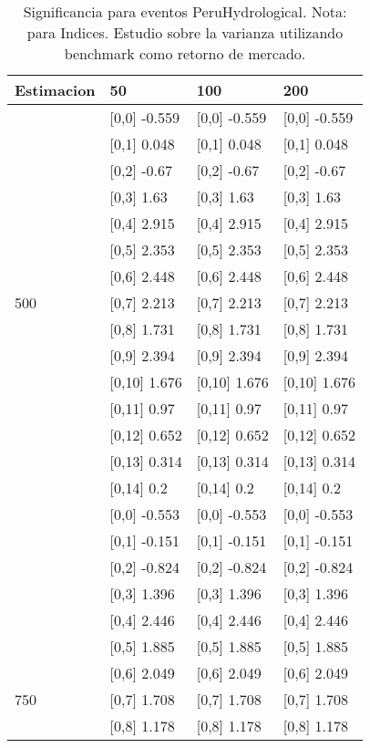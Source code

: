 \begin{table}

\caption{Significancia para eventos PeruHydrological. Nota: para Indices. Estudio sobre la varianza utilizando benchmark como retorno de mercado.}
\centering
\begin{tabular}[t]{llll}
\toprule
Estimacion & 50 & 100 & 200\\
\midrule
 & {}[0,0] -0.559 & {}[0,0] -0.559 & {}[0,0] -0.559\\
 & {}[0,1] 0.048 & {}[0,1] 0.048 & {}[0,1] 0.048\\
 & {}[0,2] -0.67 & {}[0,2] -0.67 & {}[0,2] -0.67\\
 & {}[0,3] 1.63 & {}[0,3] 1.63 & {}[0,3] 1.63\\
 & {}[0,4] 2.915 & {}[0,4] 2.915 & {}[0,4] 2.915\\
\addlinespace
 & {}[0,5] 2.353 & {}[0,5] 2.353 & {}[0,5] 2.353\\
 & {}[0,6] 2.448 & {}[0,6] 2.448 & {}[0,6] 2.448\\
500 & {}[0,7] 2.213 & {}[0,7] 2.213 & {}[0,7] 2.213\\
 & {}[0,8] 1.731 & {}[0,8] 1.731 & {}[0,8] 1.731\\
 & {}[0,9] 2.394 & {}[0,9] 2.394 & {}[0,9] 2.394\\
\addlinespace
 & {}[0,10] 1.676 & {}[0,10] 1.676 & {}[0,10] 1.676\\
 & {}[0,11] 0.97 & {}[0,11] 0.97 & {}[0,11] 0.97\\
 & {}[0,12] 0.652 & {}[0,12] 0.652 & {}[0,12] 0.652\\
 & {}[0,13] 0.314 & {}[0,13] 0.314 & {}[0,13] 0.314\\
 & {}[0,14] 0.2 & {}[0,14] 0.2 & {}[0,14] 0.2\\
\addlinespace
 & {}[0,0] -0.553 & {}[0,0] -0.553 & {}[0,0] -0.553\\
 & {}[0,1] -0.151 & {}[0,1] -0.151 & {}[0,1] -0.151\\
 & {}[0,2] -0.824 & {}[0,2] -0.824 & {}[0,2] -0.824\\
 & {}[0,3] 1.396 & {}[0,3] 1.396 & {}[0,3] 1.396\\
 & {}[0,4] 2.446 & {}[0,4] 2.446 & {}[0,4] 2.446\\
\addlinespace
 & {}[0,5] 1.885 & {}[0,5] 1.885 & {}[0,5] 1.885\\
 & {}[0,6] 2.049 & {}[0,6] 2.049 & {}[0,6] 2.049\\
750 & {}[0,7] 1.708 & {}[0,7] 1.708 & {}[0,7] 1.708\\
 & {}[0,8] 1.178 & {}[0,8] 1.178 & {}[0,8] 1.178\\

\end{tabular}
\end{table}
